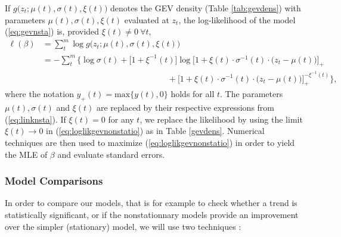 If $g\big(z_t; \mu(t),\sigma(t),\xi(t)\big)$ denotes the GEV density (Table \ref{tab:gevdens}) with parameters $\mu(t),\sigma(t),\xi(t)$ evaluated at $z_t$, the log-likelihood of the model (\ref{eq:gevnsta}) is, provided $\xi(t)\neq0 \ \forall t$,
\begin{equation}\label{eq:loglikgevnonstatio}
\begin{aligned}
\ell(\beta)& = \sum_t^m\log g\big(z_t; \mu(t),\sigma(t),\xi(t)\big)\\ & = -\sum_t^m\Bigg\{ \log\sigma(t)+\big[1+\xi^{-1}(t)\big]\log\bigg[1+\xi(t)\cdot\sigma^{-1}(t)\cdot\Big(z_t-\mu(t)\Big)\bigg]_+ \\ & \qquad\qquad\qquad\qquad\qquad\qquad\qquad\quad +  \bigg[1+\xi(t)\cdot\sigma^{-1}(t)\cdot\Big(z_t-\mu(t)\Big)\bigg]_+^{-\xi^{-1}(t)} \Bigg\},
\end{aligned}
\end{equation}
where the notation  $y_+(t)=\text{max}\big\{y(t),0\big\}$ holds for all $t$. The parameters $\mu(t),\sigma(t)$ and $\xi(t)$ are replaced by their respective expressions from (\ref{eq:linknsta}). If $\xi(t)=0$ for any $t$, we replace the likelihood by using the limit $\xi(t)\to0$ in (\ref{eq:loglikgevnonstatio}) as in Table \ref{gevdens}. 
Numerical techniques are then used to maximize (\ref{eq:loglikgevnonstatio}) in order to yield the MLE of $\beta$ and evaluate standard errors.  



\subsubsection*{Model Comparisons}

In order to compare our models, that is for example to check whether a trend is statistically significant, or if the nonstationnary models provide an improvement over the simpler (stationary) model, we will use two techniques :

